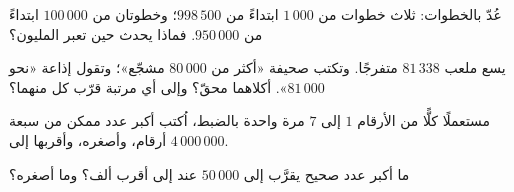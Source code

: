 \begin{exercise}[$\star$]\label{exo:g4:numbers:8}
عُدّ بالخطوات: ثلاث خطوات من $1\,000$ ابتداءً من $998\,500$؛
وخطوتان من $100\,000$ ابتداءً من $950\,000$. فماذا يحدث 
حين تعبر المليون؟
\end{exercise}

\begin{exercise}[$\star$]\label{exo:g4:numbers:9}
يسع ملعب $81\,338$ متفرجًا. وتكتب صحيفة «أكثر من
$80\,000$ مشجّع»؛ وتقول إذاعة «نحو $81\,000$». أكلاهما
محقّ؟ وإلى أي مرتبة قرّب كل منهما؟
\end{exercise}

\begin{exercise}[$\star\star$]\label{exo:g4:numbers:10}
مستعملًا كلًّا من الأرقام $1$ إلى $7$ مرة واحدة بالضبط، اُكتب
أكبر عدد ممكن من سبعة أرقام، وأصغره، وأقربها إلى
$4\,000\,000$.
\end{exercise}

\begin{exercise}[$\star\star$]\label{exo:g4:numbers:11}
ما أكبر عدد صحيح يقرَّب إلى $50\,000$ عند  إلى
أقرب ألف؟ وما أصغره؟
\end{exercise}
